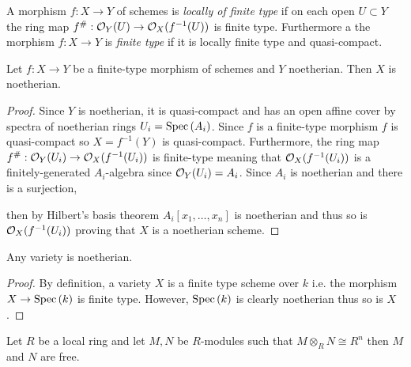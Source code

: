 \documentclass[12pt]{article}
\begin{document}
\begin{definition}
A morphism $f : X \to Y$ of schemes is \textit{locally of finite type} if on each open $U \subset Y$ the ring map $f^\# : \mathcal{O}_{Y}(U) \to \mathcal{O}_{X}(f^{-1}(U))$ is finite type. Furthermore a the morphism $f :  X \to Y$ is \textit{finite type} if it is locally finite type and quasi-compact.
\end{definition}

\begin{lemma}
Let $f : X \to Y$ be a finite-type morphism of schemes and $Y$ noetherian. Then $X$ is noetherian.
\end{lemma}

\begin{proof}
Since $Y$ is noetherian, it is quasi-compact and has an open affine cover by spectra of noetherian rings $U_i = \mathrm{Spec}\left( A_i \right)$. Since $f$ is a finite-type morphism $f$ is quasi-compact so $X = f^{-1}(Y)$ is quasi-compact. Furthermore, the ring map $f^\# : \mathcal{O}_{Y}(U_i) \to \mathcal{O}_{X}(f^{-1}(U_i))$ is finite-type meaning that $\mathcal{O}_{X}(f^{-1}(U_i))$ is a finitely-generated $A_i$-algebra since $\mathcal{O}_{Y}(U_i) = A_i$. Since $A_i$ is noetherian and there is a surjection, \begin{center}
\end{center}
then by Hilbert's basis theorem $A_i[x_1, \dots, x_n]$ is noetherian and thus so is $\mathcal{O}_{X}(f^{-1}(U_i))$ proving that $X$ is a noetherian scheme. 
\end{proof}

\begin{corollary}
Any variety is noetherian.
\end{corollary}

\begin{proof}
By definition, a variety $X$ is a finite type scheme over $k$ i.e. the morphism $X \to \mathrm{Spec}\left( k \right)$ is finite type. However, $\mathrm{Spec}\left( k \right)$ is clearly noetherian thus so is $X$.
\end{proof}

\begin{lemma} \label{tensor_inverse}
Let $R$ be a local ring and let $M, N$ be $R$-modules such that $M \otimes_R N \cong R^n$ then $M$ and $N$ are free.
\end{lemma}
\end{document}
